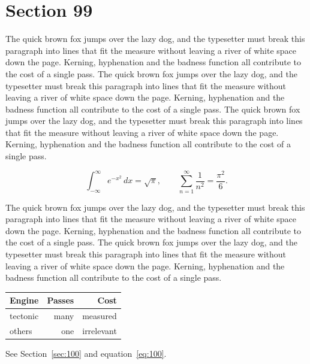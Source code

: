 \documentclass{article}
\begin{document}
\section{Section 99}
\label{sec:99}
The quick brown fox jumps over the lazy dog, and the typesetter must break this paragraph into lines that fit the measure without leaving a river of white space down the page. Kerning, hyphenation and the badness function all contribute to the cost of a single pass. The quick brown fox jumps over the lazy dog, and the typesetter must break this paragraph into lines that fit the measure without leaving a river of white space down the page. Kerning, hyphenation and the badness function all contribute to the cost of a single pass. The quick brown fox jumps over the lazy dog, and the typesetter must break this paragraph into lines that fit the measure without leaving a river of white space down the page. Kerning, hyphenation and the badness function all contribute to the cost of a single pass. 

\begin{equation}\label{eq:99}
\int_{-\infty}^{\infty} e^{-x^{2}}\,dx = \sqrt{\pi}, \qquad
\sum_{n=1}^{\infty} \frac{1}{n^{2}} = \frac{\pi^{2}}{6}.
\end{equation}

The quick brown fox jumps over the lazy dog, and the typesetter must break this paragraph into lines that fit the measure without leaving a river of white space down the page. Kerning, hyphenation and the badness function all contribute to the cost of a single pass. The quick brown fox jumps over the lazy dog, and the typesetter must break this paragraph into lines that fit the measure without leaving a river of white space down the page. Kerning, hyphenation and the badness function all contribute to the cost of a single pass. 

\begin{center}
\begin{tabular}{lrr}
\toprule
Engine & Passes & Cost \\
\midrule
tectonic & many & measured \\
others & one & irrelevant \\
\bottomrule
\end{tabular}
\end{center}

See Section~\ref{sec:100} and equation~\eqref{eq:100}.
\end{document}
